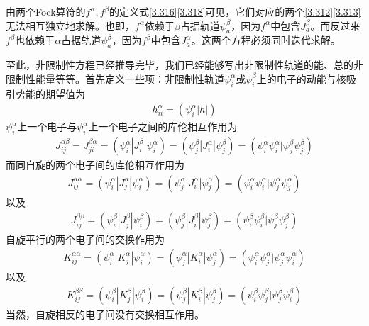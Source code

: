 由两个Fock算符的$f^\alpha,f^\beta$的定义式\eqref{3.316}\eqref{3.318}可见，它们对应的两个\eqref{3.312}\eqref{3.313}无法相互独立地求解。也即，$f^\alpha$依赖于$\beta$占据轨道$\psi_a^\beta$，因为$f^\alpha$中包含$J_a^\beta$。而反过来$f^\beta$也依赖于$\alpha$占据轨道$\psi_a^\beta$，因为$f^\beta$中包含$J_a^\alpha$。这两个方程必须同时迭代求解。

至此，非限制性\hft 方程已经推导完毕，我们已经能够写出非限制性轨道的能、总的非限制性能量等等。首先定义一些项：非限制性轨道$\psi_i^\alpha$或$\psi_i^\beta$上的电子的动能与核吸引势能的期望值为
\begin{align}
h_{ii}^\alpha = (\psi_i^\alpha|h|)
\end{align}
$\psi_i^\alpha$上一个电子与$\psi_i^\alpha$上一个电子之间的库伦相互作用为
\begin{align}
    J_{ij}^{\alpha\beta} = J_{ji}^{\beta\alpha} = (\psi_i^\alpha|J_{i}^\beta|\psi_i^\alpha) = (\psi_j^\beta|J_{i}^\alpha|\psi_j^\beta) = (\psi_i^\alpha\psi_i^\alpha|\psi_j^\beta\psi_j^\beta)
\end{align}
而同自旋的两个电子间的库伦相互作用为
\begin{align}
    J_{i j}^{\alpha \alpha}=(\psi_{i}^{\alpha}|J_{j}^{\alpha}| \psi_{i}^{\alpha})=(\psi_{j}^{\alpha}|J_{i}^{\alpha}| \psi_{j}^{\alpha})=(\psi_{i}^{\alpha} \psi_{i}^{\alpha} | \psi_{j}^{\alpha} \psi_{j}^{\alpha})
\end{align}
以及
\begin{align}
    J_{i j}^{\beta \beta}=(\psi_{i}^{\beta}|J_{j}^{\beta}| \psi_{i}^{\beta})=(\psi_{j}^{\beta}|J_{i}^{\beta}| \psi_{j}^{\beta})=(\psi_{i}^{\beta} \psi_{i}^{\beta} | \psi_{j}^{\beta} \psi_{j}^{\beta})
\end{align}
自旋平行的两个电子间的交换作用为
\begin{align}
    K_{i j}^{\alpha\alpha}=(\psi_{i}^{\alpha}|K_{j}^{\alpha}| \psi_{i}^{\alpha})=(\psi_{j}^{\alpha}|K_{i}^{\alpha}| \psi_{j}^{\alpha})=(\psi_{i}^{\alpha} \psi_{j}^{\alpha} | \psi_{j}^{\alpha} \psi_{i}^{\alpha})
\end{align}
以及
\begin{align}
    K_{i j}^{\beta\beta}=(\psi_{i}^{\beta}|K_{j}^{\beta}| \psi_{i}^{\beta})=(\psi_{j}^{\beta}|K_{i}^{\beta}| \psi_{j}^{\beta})=(\psi_{i}^{\beta} \psi_{j}^{\beta} | \psi_{j}^{\beta} \psi_{i}^{\beta})
\end{align}
当然，自旋相反的电子间没有交换相互作用。

